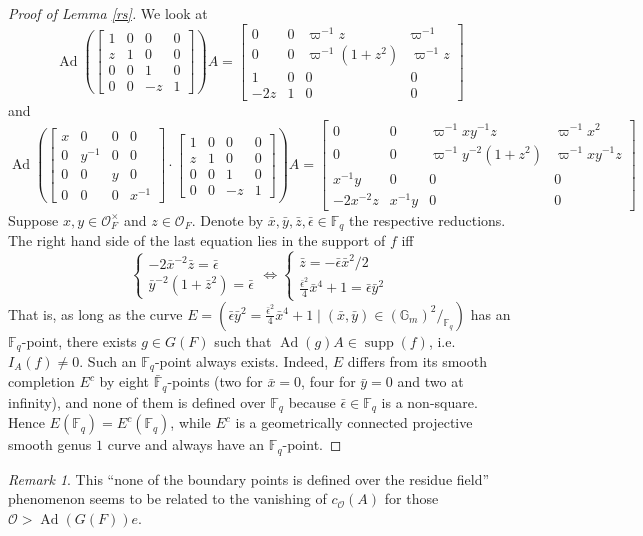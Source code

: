 \documentclass[11pt]{amsart}
\theoremstyle{remark}
\newtheorem{remark}[theorem]{Remark}
\newcommand{\F}{\mathbb{F}}
\newcommand{\cO}{\mathcal{O}}
\newcommand{\Ad}{\operatorname{Ad}}
\newcommand{\matr}[1]{\left[\begin{matrix}#1\end{matrix}\right]}
\newcommand{\supp}{\operatorname{supp}}
\begin{document}
\begin{proof}[Proof of Lemma \ref{rs}]
We look at
\[
\Ad(\matr{1&0&0&0\\z&1&0&0\\0&0&1&0\\0&0&-z&1})A=
\matr{
	0&0&\varpi^{-1}z&\varpi^{-1}\\
	0&0&\varpi^{-1}(1+z^2)&\varpi^{-1}z\\
	1&0&0&0\\
	-2z&1&0&0
}
\]
and
\[
\Ad(\matr{x&0&0&0\\0&y^{-1}&0&0\\0&0&y&0\\0&0&0&x^{-1}}\cdot\matr{1&0&0&0\\z&1&0&0\\0&0&1&0\\0&0&-z&1})A=
\matr{
	0&0&\varpi^{-1}xy^{-1}z&\varpi^{-1}x^2\\
	0&0&\varpi^{-1}y^{-2}(1+z^2)&\varpi^{-1}xy^{-1}z\\
	x^{-1}y&0&0&0\\
	-2x^{-2}z&x^{-1}y&0&0
}
\]
Suppose $x,y\in\cO_F^{\times}$ and $z\in\cO_F$. Denote by $\bar{x},\bar{y},\bar{z},\bar{\epsilon}\in\F_q$ the respective reductions. The right hand side of the last equation lies in the support of $f$ iff
\[
\left\{\begin{array}{l}-2\bar{x}^{-2}\bar{z}=\bar{\epsilon}\\\bar{y}^{-2}(1+\bar{z}^2)=\bar{\epsilon}
\end{array}\right.\Leftrightarrow\left\{\begin{array}{l}\bar{z}=-\bar{\epsilon}\bar{x}^2/2\\\frac{\bar{\epsilon}^2}{4}\bar{x}^4+1=\bar{\epsilon}\bar{y}^2
\end{array}\right.
\]
That is, as long as the curve $E=(\bar{\epsilon}\bar{y}^2=\frac{\bar{\epsilon}^2}{4}\bar{x}^4+1\;|\;(\bar{x},\bar{y})\in(\mathbb{G}_m)^2/_{\F_q})$ has an $\F_q$-point, there exists $g\in G(F)$ such that $\Ad(g)A\in\supp(f)$, i.e. $I_A(f)\not=0$. Such an $\F_q$-point always exists. Indeed, $E$ differs from its smooth completion $E^c$ by eight $\bar{\F}_q$-points (two for $\bar{x}=0$, four for $\bar{y}=0$ and two at infinity), and none of them is defined over $\F_q$ because $\bar{\epsilon}\in\F_q$ is a non-square. Hence $E(\F_q)=E^c(\F_q)$, while $E^c$ is a geometrically connected projective smooth genus $1$ curve and always have an $\F_q$-point.
\end{proof}

\begin{remark} This ``none of the boundary points is defined over the residue field'' phenomenon seems to be related to the vanishing of $c_{\cO}(A)$ for those $\cO>\Ad(G(F))e$.
\end{remark}
\end{document}
